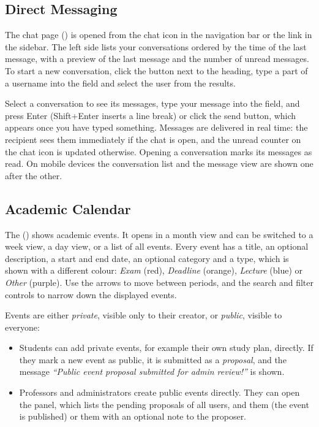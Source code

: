 
\subsection{Direct Messaging}

The chat page () is opened from the chat icon in the navigation bar or
the  link in the sidebar. The left side lists your conversations ordered
by the time of the last message, with a preview of the last message and the number of
unread messages. To start a new conversation, click the \ui{+} button next to the
 heading, type a part of a username into the  field and
select the user from the results.

Select a conversation to see its messages, type your message into the
 field, and press Enter (Shift+Enter inserts a line break) or
click the send button, which appears once you have typed something. Messages are
delivered in real time: the recipient sees them immediately if the chat is open, and
the unread counter on the chat icon is updated otherwise. Opening a conversation marks
its messages as read. On mobile devices the conversation list and the message view are
shown one after the other.


\subsection{Academic Calendar}

The  () shows academic events. It opens in a
month view and can be switched to a week view, a day view, or a list of all events.
Every event has a title, an optional description, a start and end date, an optional
category and a type, which is shown with a different colour: \emph{Exam} (red),
\emph{Deadline} (orange), \emph{Lecture} (blue) or \emph{Other} (purple). Use the
arrows to move between periods, and the search and filter controls to narrow down the
displayed events.

Events are either \emph{private}, visible only to their creator, or \emph{public},
visible to everyone:

\begin{itemize}
  \item Students can add private events, for example their own study plan, directly. If
    they mark a new event as public, it is submitted as a \emph{proposal}, and the
    message \emph{``Public event proposal submitted for admin review!''} is shown.
  \item Professors and administrators create public events directly. They can open the
     panel, which lists the pending proposals of all users, and
     them (the event is published) or  them with an optional note
    to the proposer.
\end{itemize}


